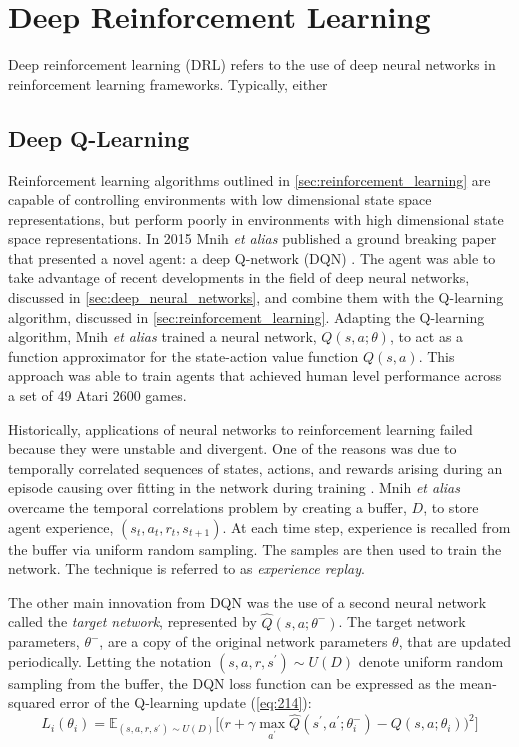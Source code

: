 \section{Deep Reinforcement Learning}\label{drl}
Deep reinforcement learning (DRL) refers to the use of deep neural networks in reinforcement learning frameworks. Typically, either 

\subsection{Deep Q-Learning}
Reinforcement learning algorithms outlined in \textsection \ref{sec:reinforcement_learning} are capable of controlling environments with low dimensional state space representations, but perform poorly in environments with high dimensional state space representations. In 2015 Mnih \textit{et alias} published a ground breaking paper that presented a novel agent: a deep Q-network (DQN) \cite{Mnih2015}. The agent was able to take advantage of recent developments in the field of deep neural networks, discussed in \textsection \ref{sec:deep_neural_networks}, and combine them with the Q-learning algorithm, discussed in \textsection \ref{sec:reinforcement_learning}. Adapting the Q-learning algorithm, Mnih \textit{et alias} trained a neural network, $Q(s,a;\theta)$, to act as a function approximator for the state-action value function $Q(s,a)$. This approach was able to train agents that achieved human level performance across a set of 49 Atari 2600 games.

Historically, applications of neural networks to reinforcement learning failed because they were unstable and divergent. One of the reasons was due to temporally correlated sequences of states, actions, and rewards arising during an episode causing over fitting in the network during training \cite{Tsitsiklis1997}. Mnih \textit{et alias} overcame the temporal correlations problem by creating a buffer, $D$, to store agent experience, $(s_t, a_t, r_t, s_{t+1})$. At each time step, experience is recalled from the buffer via uniform random sampling. The samples are then used to train the network. The technique is referred to as \textit{experience replay}.

The other main innovation from DQN was the use of a second neural network called the \textit{target network}, represented by $\hat{Q}(s,a;\theta^-)$. The target network parameters, $\theta^-$, are a copy of the original network parameters $\theta$, that are updated periodically. Letting the notation $(s,a,r,s^\prime) \sim U(D)$ denote uniform random sampling from the buffer, the DQN loss function can be expressed as the mean-squared error of the Q-learning update (\ref{eq:214}):
\begin{equation}
	L_i(\theta_i) = \mathbb{E}_{(s,a,r,s^\prime) \sim U(D)} \bigg[ \bigg( r + \gamma \max_{a^\prime} \hat{Q}(s^\prime, a^\prime; \theta_i^-) - Q(s, a; \theta_i) \bigg)^2 \bigg] \label{eq:2401}
\end{equation}

